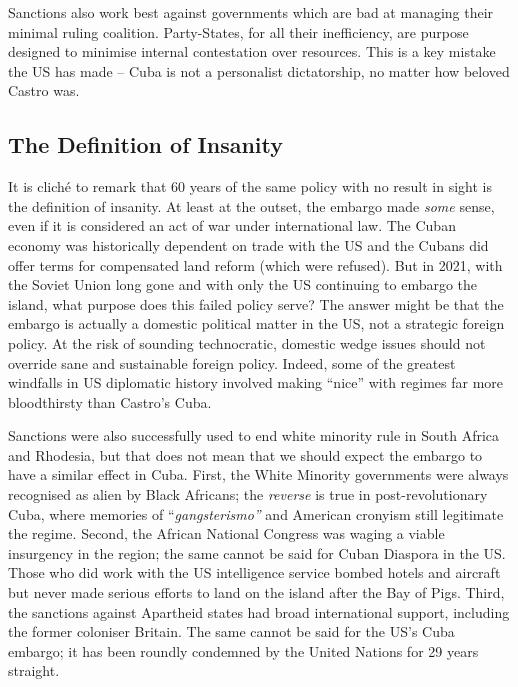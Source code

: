 \documentclass[letterpaper,12pt,twoside]{article} %
\begin{document}
\begin{multicols}{2}
Sanctions also work best against governments which are bad at managing their minimal ruling coalition. Party-States, for all their inefficiency, are purpose designed to minimise internal contestation over resources.\autocite{escriba2010dealing} This is a key mistake the US has made -- Cuba is not a personalist dictatorship, no matter how beloved Castro was.

\subsection*{The Definition of Insanity}

It is cliché to remark that 60 years of the same policy with no result in sight is the definition of insanity. At least at the outset, the embargo made \textit{some} sense, even if it is considered an act of war under international law. The Cuban economy was historically dependent on trade with the US and the Cubans did offer terms for compensated land reform (which were refused). But in 2021, with the Soviet Union long gone and with only the US continuing to embargo the island, what purpose does this failed policy serve? The answer might be that the embargo is actually a domestic political matter in the US, not a strategic foreign policy. At the risk of sounding technocratic, domestic wedge issues should not override sane and sustainable foreign policy. Indeed, some of the greatest windfalls in US diplomatic history involved making ``nice'' with regimes far more bloodthirsty than Castro's Cuba.

Sanctions were also successfully used to end white minority rule in South Africa and Rhodesia, but that does not mean that we should expect the embargo to have a similar effect in Cuba. First, the White Minority governments were always recognised as alien by Black Africans; the \textit{reverse} is true in post-revolutionary Cuba, where memories of ``\textit{gangsterismo''} and American cronyism still legitimate the regime. Second, the African National Congress was waging a viable insurgency in the region; the same cannot be said for Cuban Diaspora in the US. Those who did work with the US intelligence service bombed hotels and aircraft but never made serious efforts to land on the island after the Bay of Pigs. Third, the sanctions against Apartheid states had broad international support, including the former coloniser Britain. The same cannot be said for the US's Cuba embargo; it has been roundly condemned by the United Nations for 29 years straight.\autocite{un29condemn}


\end{multicols}
\end{document}
